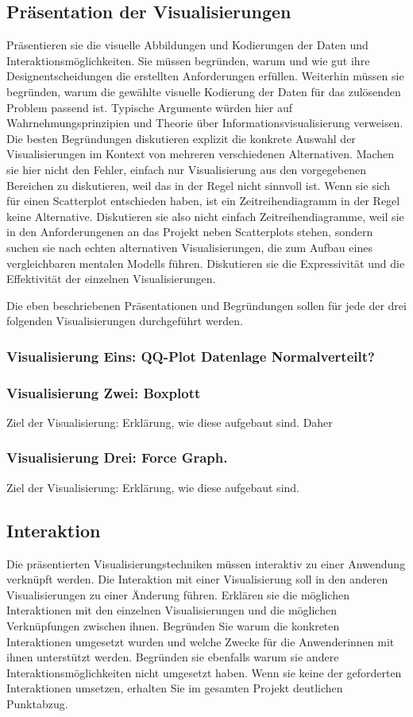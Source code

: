 \documentclass[usegeometry=true]{scrartcl}
\begin{document}
\subsection{Präsentation der Visualisierungen}
Präsentieren sie die visuelle Abbildungen und Kodierungen der Daten und Interaktionsmöglichkeiten. 
Sie müssen  begründen, warum und wie gut ihre Designentscheidungen die erstellten Anforderungen erfüllen. 
Weiterhin müssen sie begründen, warum die gewählte visuelle Kodierung der Daten für das zulösenden Problem passend ist.
Typische Argumente würden hier auf Wahrnehmungsprinzipien und Theorie über Informationsvisualisierung verweisen. 
Die besten Begründungen diskutieren explizit die konkrete Auswahl der Visualisierungen im Kontext von mehreren verschiedenen Alternativen. 
Machen sie hier nicht den Fehler, einfach nur Visualisierung aus den vorgegebenen Bereichen zu diskutieren, weil das in der Regel nicht sinnvoll ist.
Wenn sie sich für einen Scatterplot entschieden haben, ist ein Zeitreihendiagramm in der Regel keine Alternative.
Diskutieren sie also nicht einfach Zeitreihendiagramme, weil sie in den Anforderungenen an das Projekt neben Scatterplots stehen, sondern suchen sie nach echten alternativen Visualisierungen, die zum Aufbau eines vergleichbaren mentalen Modells führen. 
Diskutieren sie die Expressivität und die Effektivität der einzelnen Visualisierungen. 

Die eben beschriebenen Präsentationen und Begründungen sollen für jede der drei folgenden Visualisierungen durchgeführt werden. 
\subsubsection{Visualisierung Eins: QQ-Plot Datenlage Normalverteilt?}

\subsubsection{Visualisierung Zwei: Boxplott}
Ziel der Visualisierung: 
Erklärung, wie diese aufgebaut sind. Daher 
\subsubsection{Visualisierung Drei: Force Graph.}
Ziel der Visualisierung: 
Erklärung, wie diese aufgebaut sind. 
\subsection{Interaktion}
Die präsentierten Visualisierungstechniken müssen interaktiv zu einer Anwendung verknüpft werden.
Die Interaktion mit einer Visualisierung soll in den anderen Visualisierungen zu einer Änderung führen. 
Erklären sie die möglichen Interaktionen mit den einzelnen Visualisierungen und die möglichen Verknüpfungen zwischen ihnen. Begründen Sie warum die konkreten Interaktionen umgesetzt wurden und welche Zwecke für die Anwenderinnen mit ihnen unterstützt werden. Begründen sie ebenfalls warum sie andere Interaktionsmöglichkeiten nicht umgesetzt haben. Wenn sie keine der geforderten Interaktionen umsetzen, erhalten Sie im gesamten Projekt deutlichen Punktabzug. 
\end{document}
